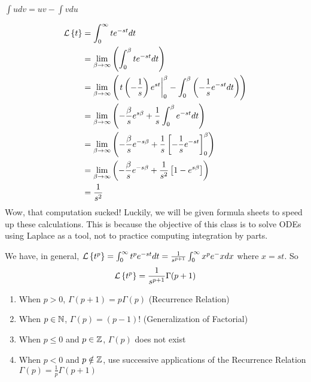 \begin{example}
    \begin{recall}
        $\int udv = uv - \int vdu$
    \end{recall}

    \begin{align*}
        \operatorname{\mathcal{L}}\left\{t\right\} &= \int_0^\infty t e^{-st} dt \\
        &= \lim_{\beta \to \infty} \left( \int_{0}^{\beta} te^{-st} dt \right) \\
        &= \lim_{\beta \to \infty} \left( \left.t\left(-\frac{1}{s}\right) e^{st}\right|_0^\beta - \int_0^\beta \left(-\frac{1}{s} e^{-st} dt\right) \right) \\
        &= \lim_{\beta \to \infty} \left( -\frac{\beta}{s}e^{s\beta} + \frac{1}{s} \int_0^\beta e^{-st} dt \right) \\
        &= \lim_{\beta \to \infty} \left( -\frac{\beta}{s} e^{-s\beta} + \frac{1}{s} \left[-\frac{1}{s} e^{-st}\right]_0^\beta \right) \\
        &= \lim_{\beta \to \infty} \left( -\frac{\beta}{s} e^{-s\beta} + \frac{1}{s^2}\left[1 - e^{s\beta}\right] \right) \\
        &= \frac{1}{s^2}
    \end{align*}
    Wow, that computation sucked! Luckily, we will be given formula sheets to speed up these calculations. This is because the objective of this class is to solve ODEs using Laplace as a tool, not to practice computing integration by parts.
\end{example}

\begin{theorem}
    We have, in general, $\operatorname{\mathcal{L}}\left\{t^p\right\} = \int_0^\infty t^p e^{-st} dt = \frac{1}{s^{p+1}} \int_0^\infty x^p e^-x dx$ where $x = st$. 
    So $$\operatorname{\mathcal{L}}\left\{t^p\right\} = \frac{1}{s^{p+1}} \Gamma (p+1)$$ 
\end{theorem}

\begin{theorem}
    \spacebeforelist
    \begin{enumerate}
        \item When $p > 0$, $\Gamma (p+1) = p\Gamma(p)$ (Recurrence Relation)
        \item When $p \in \mathbb{N}$, $\Gamma(p) = (p-1)!$ (Generalization of Factorial)
        \item When $p \leq 0$ and $p \in \mathbb{Z}$, $\Gamma(p)$ does not exist
        \item When $p < 0$ and $p \notin \mathbb{Z}$, use successive applications of the Recurrence Relation $\Gamma(p) = \frac{1}{p} \Gamma (p + 1)$
    \end{enumerate}
\end{theorem}